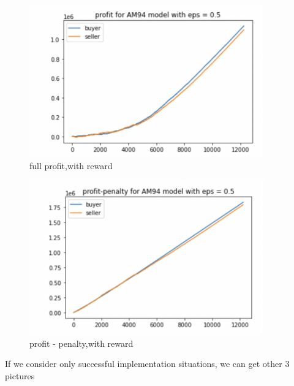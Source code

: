 \documentclass[11pt]{article}
\begin{document}
\begin{figure}[H]
	\begin{center}
	\includegraphics[width=0.9\textwidth]{2.PNG}
	\end{center}
	\caption{full profit,with reward}
	\label{FIG.2}
\end{figure}

\begin{figure}[H]
	\begin{center}
	\includegraphics[width=0.9\textwidth]{3.PNG}
	\end{center}
	\caption{profit - penalty,with reward}
	\label{FIG.3}
\end{figure}	

If we consider only successful implementation situations, we can get other 3 pictures
\end{document}
